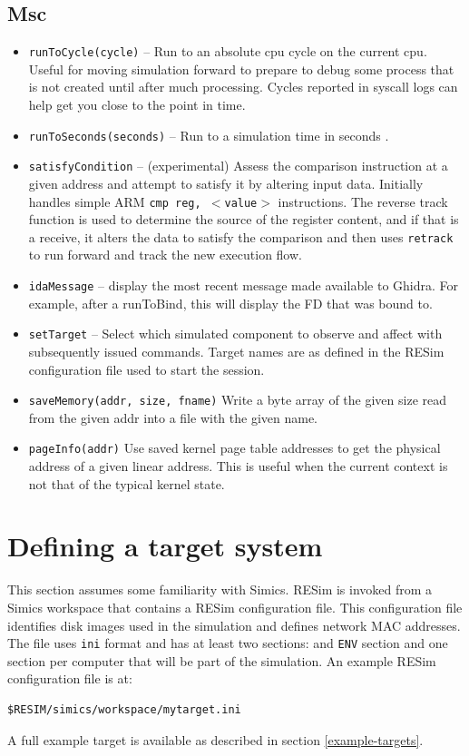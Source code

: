 \documentclass[titlepage]{article}
\begin{document}
\subsection{Msc}
\begin{itemize}
\item{\tt runToCycle(cycle)} -- Run to an absolute cpu cycle on the current cpu.  Useful for moving simulation forward to prepare to debug some process
that is not created until after much processing.  Cycles reported in syscall logs can help get you close to the point in time.

\item{\tt runToSeconds(seconds)} -- Run to a simulation time in seconds .  

\item{\tt satisfyCondition} -- (experimental) Assess the comparison instruction at a given address and attempt to satisfy it by altering input data.  
Initially handles simple ARM {\tt cmp reg, $<$value$>$} instructions.  The 
reverse track function is used to determine the source of the register content, and if that is a receive, it alters the data to satisfy the
comparison and then uses {\tt retrack} to run forward and track the new execution flow.

\item{\tt idaMessage} -- display the most recent message made available to Ghidra.  For example, after a runToBind, this will display the FD that was bound to.
\item {\tt setTarget} -- Select which simulated component to observe and affect with subsequently issued commands.  Target names are as defined in the
RESim configuration file used to start the session.

\item {\tt saveMemory(addr, size, fname)} Write a byte array of the given size read from the given addr into a file with the given name.

\item {\tt pageInfo(addr)} Use saved kernel page table addresses to get the physical address of a given linear address.  This is useful when the current
context is not that of the typical kernel state.



\end{itemize}

\section{Defining a target system}
\label{configuration}
This section assumes some familiarity with Simics.  RESim is invoked from a Simics workspace that contains a RESim configuration file.
This configuration file identifies disk images used in the simulation and defines network MAC addresses.  
The file uses {\tt ini} format and has at least two sections: and {\tt ENV} section and one section per computer that will be part
of the simulation.  An example RESim configuration file is at:
\begin{verbatim}
$RESIM/simics/workspace/mytarget.ini
\end{verbatim}
A full example target is available as described in section \ref{example-targets}.
\end{document}
